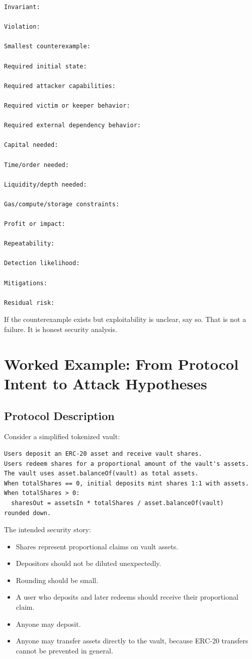 \begin{lstlisting}
Invariant:

Violation:

Smallest counterexample:

Required initial state:

Required attacker capabilities:

Required victim or keeper behavior:

Required external dependency behavior:

Capital needed:

Time/order needed:

Liquidity/depth needed:

Gas/compute/storage constraints:

Profit or impact:

Repeatability:

Detection likelihood:

Mitigations:

Residual risk:
\end{lstlisting}

If the counterexample exists but exploitability is unclear, say so. That
is not a failure. It is honest security analysis.

\section{Worked Example: From Protocol Intent to Attack Hypotheses}

\subsection{Protocol Description}

Consider a simplified tokenized vault:

\begin{lstlisting}
Users deposit an ERC-20 asset and receive vault shares.
Users redeem shares for a proportional amount of the vault's assets.
The vault uses asset.balanceOf(vault) as total assets.
When totalShares == 0, initial deposits mint shares 1:1 with assets.
When totalShares > 0:
  sharesOut = assetsIn * totalShares / asset.balanceOf(vault)
rounded down.
\end{lstlisting}

The intended security story:

\begin{itemize}
\tightlist
\item
  Shares represent proportional claims on vault assets.
\item
  Depositors should not be diluted unexpectedly.
\item
  Rounding should be small.
\item
  A user who deposits and later redeems should receive their
  proportional claim.
\item
  Anyone may deposit.
\item
  Anyone may transfer assets directly to the vault, because ERC-20
  transfers cannot be prevented in general.
\end{itemize}

